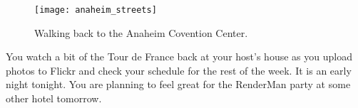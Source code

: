 \documentclass[../main.tex]{subfiles}
\begin{document}
\begin{figure}[h!]
	\centering
	\texttt{[image: anaheim\_streets]}
	\caption*{Walking back to the Anaheim Covention Center.}
\end{figure}

You watch a bit of the Tour de France back at your host's house as you upload photos to Flickr and check your schedule for the rest of the week. It is an early night tonight. You are planning to feel great for the RenderMan party at some other hotel tomorrow.
\end{document}
